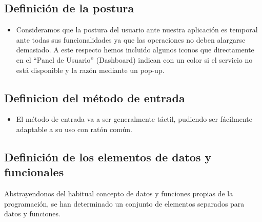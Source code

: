 \documentclass[12pt]{article}
\begin{document}
\subsection{Definición de la postura}
\begin{itemize}

\item Consideramos que la postura del usuario ante nuestra aplicación es temporal ante todas sus funcionalidades ya que las operaciones no deben alargarse demasiado. A este respecto hemos incluido algunos iconos que directamente en el “Panel de Usuario” (Dashboard) indican con un color si el servicio no está disponible y la razón mediante un pop-up.

\end{itemize}
\subsection{Definicion del método de entrada}
\begin{itemize}

\item El método de entrada va a ser generalmente táctil, pudiendo ser fácilmente adaptable a su uso con ratón común.

\end{itemize}
\subsection{Definición de los elementos de datos y funcionales }

    Abstrayendonos del habitual concepto de datos y funciones propias de la programación, se han determinado un conjunto de elementos separados para datos y funciones.
\end{document}

